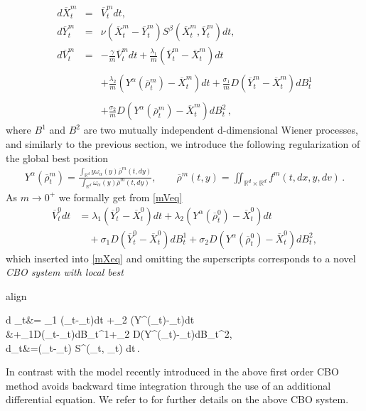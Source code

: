 \documentclass{ims9x6}
\newcommand{\coloredeq}[2]{\begin{empheq}[box={\mymath[colback=gray!13, sharp corners]}]{align}\label{#1}#2\end{empheq}}
\newcommand{\nn}{\nonumber}
\renewcommand{\bar}{\overline}
\newcommand{\OV}{\overline{V}}
\newcommand{\OX}{\overline{X}}
\newcommand{\OY}{\overline{Y}}
\begin{document}
\begin{subequations}
	\begin{eqnarray}
	d\OX_t^m &=& \OV_t^mdt, \label{mXeq}\\
	d \OY_{t}^{m} &=& \nu\left(\OX_{t}^{m}-\OY_{t}^{m}\right) S^{\beta}\left(\OX_{t}^{m}, \OY_{t}^{m}\right) d t, \label{mYeq}\\
	d\OV_{t}^{m} &=& -\frac{\gamma}{m} \OV_{t}^{m} d t+\frac{\lambda_{1}}{m}\left(\OY_{t}^{m}-\OX_{t}^{m}\right) d t \nn \\[-.2cm]
	\nonumber
	\\
	\label{mVeq}
	&& +\frac{\lambda_{2}}{m}\left({Y}^{\alpha}(\overline \rho_t^m)-\OX_{t}^{m}\right) d t +\frac{\sigma_{1}}{m} D\left(\OY_{t}^{m}-\OX_{t}^{m}\right) d B_{t}^{1} \\[-.2cm] 
	\nn\\
	&& +\frac{\sigma_{2} }{m}D\left({Y}^{\alpha}(\overline \rho_t^m)-\OX_{t}^{m}\right) d B_{t}^{2}\nn\,,
	\end{eqnarray}
\end{subequations}
where $B^1$ and $B^2$ are two mutually independent d-dimensional Wiener processes, and similarly to the previous section, we introduce the following regularization of the global best
position
\begin{align*}\label{global_best_regular}
{Y}^{\alpha}(\overline \rho^m_t)=\frac{\int_{\mathbb{R}^{d}} y \omega_{\alpha}(y) {\overline \rho}^m(t,dy) }{\int_{\mathbb{R}^{d}} \omega_{\alpha}(y) {\bar \rho}^m(t,dy) }, 
 \qquad {\overline \rho}^m(t,y)=\iint_{\mathbb{R}^{d} \times \mathbb{R}^{d}} f^m(t,dx, y,d v)\,.
\end{align*}
As $m\to 0^+$ we formally get from \eqref{mVeq}
\[
\begin{split}
\OV_{t}^{0} dt &=\lambda_1\left(\OY_t^0-\OX^0_t\right)dt +\lambda_2\left({Y}^{\alpha}(\overline \rho_t^0)-\OX^0_t\right)dt\\
&\quad +\sigma_1 D(\OY_t^0-\OX^0_t)dB^{1}_t+\sigma_2 D({Y}^{\alpha}(\overline \rho_t^0)-\OX^0_t)dB^{2}_t,
\end{split}
\] 
which inserted into \eqref{mXeq} and omitting the superscripts corresponds to a novel \emph{CBO system with local best}
\coloredeq{eq:cbozero}{
\begin{split}
d \OX_t&=
\lambda_1 (\OY_t-\OX_t)dt +\lambda_2 (Y^{\alpha}(\bar\rho_t)-\OX_t)dt \\
&\quad+\sigma_1D(\OY_t-\OX_t)dB_t^1+\sigma_2 D(Y^{\alpha}(\bar\rho_t)-\OX_t)dB_t^2,\\
d\OY_{t}&=\nu\left(\OX_{t}-\OY_{t}\right) S^{\beta}\left(\OX_{t}, \OY_{t}\right) dt\,.
\end{split}
}
In contrast with the model recently introduced in \cite{TW} the above first order CBO method avoids backward time integration through the use of an additional differential equation. We refer to \cite{grassi2021consensus} for further details on the above CBO system.
\end{document}
